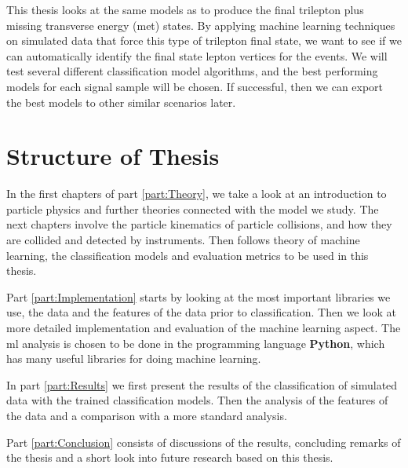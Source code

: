 \documentclass[a4paper, american, 12pt]{report}
\begin{document}
	This thesis looks at the same models as \citet{inverseseesaw} to produce the final trilepton plus missing transverse energy (\acrshort{met}) states. By applying machine learning techniques on simulated data that force this type of trilepton final state, we want to see if we can automatically identify the final state lepton vertices for the events. We will test several different classification model algorithms, and the best performing models for each signal sample will be chosen. If successful, then we can export the best models to other similar scenarios later.
	

	\section{Structure of Thesis}
	\label{sect:Intro-Structure}
	In the first chapters of part \ref{part:Theory}, we take a look at an introduction to particle physics and further theories connected with the model we study. The next chapters involve the particle kinematics of particle collisions, and how they are collided and detected by instruments. Then follows theory of machine learning, the classification models and evaluation metrics to be used in this thesis.
	
	Part \ref{part:Implementation} starts by looking at the most important libraries we use, the data and the features of the data prior to classification. Then we look at more detailed implementation and evaluation of the machine learning aspect. The \acrshort{ml} analysis is chosen to be done in the programming language \textbf{Python}, which has many useful libraries for doing machine learning.
	
	In part \ref{part:Results} we first present the results of the classification of simulated data with the trained classification models. Then the analysis of the features of the data and a comparison with a more standard analysis.
	
	Part \ref{part:Conclusion} consists of discussions of the results, concluding remarks of the thesis and a short look into future research based on this thesis.
	

	
	\newpage
\end{document}
